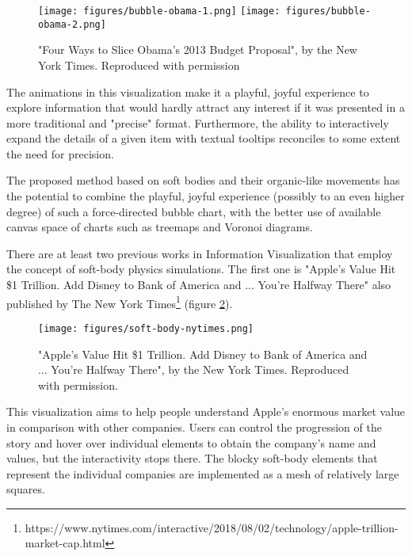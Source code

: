 \documentclass[manuscript, screen]{timtm}
\begin{document}
\begin{figure}[h]
  \centering
  \texttt{[image: figures/bubble-obama-1.png]}
  \texttt{[image: figures/bubble-obama-2.png]}
  \caption{"Four Ways to Slice Obama’s 2013 Budget Proposal", by the New York Times. Reproduced with permission}
  \label{fig:nyt-obama}
\end{figure}

The animations in this visualization make it a playful, joyful experience to explore information that would hardly attract any interest if it was presented in a more traditional and "precise" format. Furthermore, the ability to interactively expand the details of a given item with textual tooltips reconciles to some extent the need for precision.

The proposed method based on soft bodies and their organic-like movements has the potential to combine the playful, joyful experience (possibly to an even higher degree) of such a force-directed bubble chart, with the better use of available canvas space of charts such as treemaps and Voronoi diagrams.

There are at least two previous works in Information Visualization that employ the concept of soft-body physics simulations. The first one is "Apple’s Value Hit \$1 Trillion. Add Disney to Bank of America and ... You’re Halfway There" also published by The New York Times\footnote{https://www.nytimes.com/interactive/2018/08/02/technology/apple-trillion-market-cap.html} (figure \ref{fig:nyt-apple}).

\begin{figure}[h]
  \centering
  \texttt{[image: figures/soft-body-nytimes.png]}
  \caption{"Apple’s Value Hit \$1 Trillion. Add Disney to Bank of America and ... You’re Halfway There", by the New York Times. Reproduced with permission.}
  \label{fig:nyt-apple}
\end{figure}

This visualization aims to help people understand Apple's enormous market value in comparison with other companies. Users can control the progression of the story and hover over individual elements to obtain the company's name and values, but the interactivity stops there. The blocky soft-body elements that represent the individual companies are implemented as a mesh of relatively large squares.
\end{document}
